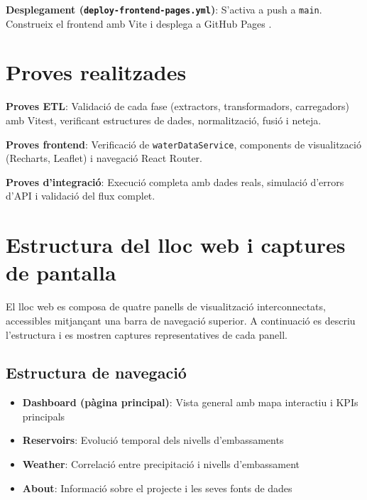 \textbf{Desplegament (\texttt{deploy-frontend-pages.yml})}: S'activa a push a \texttt{main}. Construeix el frontend amb Vite \cite{vite} i desplega a GitHub Pages \cite{github_pages}.


\section{Proves realitzades}

\textbf{Proves ETL}: Validació de cada fase (extractors, transformadors, carregadors) amb Vitest, verificant estructures de dades, normalització, fusió i neteja.

\textbf{Proves frontend}: Verificació de \texttt{waterDataService}, components de visualització (Recharts, Leaflet) i navegació React Router.

\textbf{Proves d'integració}: Execució completa amb dades reals, simulació d'errors d'API i validació del flux complet.


\section{Estructura del lloc web i captures de pantalla}

El lloc web es composa de quatre panells de visualització interconnectats, accessibles mitjançant una barra de navegació superior. A continuació es descriu l'estructura i es mostren captures representatives de cada panell.

\subsection{Estructura de navegació}

\begin{itemize}
    \item \textbf{Dashboard (pàgina principal)}: Vista general amb mapa interactiu i KPIs principals
    \item \textbf{Reservoirs}: Evolució temporal dels nivells d'embassaments
    \item \textbf{Weather}: Correlació entre precipitació i nivells d'embassament
    \item \textbf{About}: Informació sobre el projecte i les seves fonts de dades
\end{itemize}

